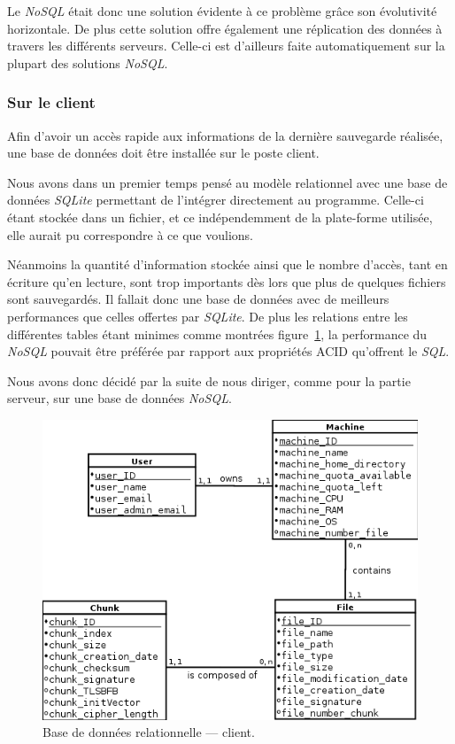 \documentclass[a4paper,10pt, twoside]{report}
\begin{document}
\begin{spacing}{1.2}
Le \textit{NoSQL} était donc une solution évidente à ce problème grâce son
évolutivité horizontale. De plus cette solution offre également une réplication
des données à travers les différents serveurs. Celle-ci est d'ailleurs faite
automatiquement sur la plupart des solutions \textit{NoSQL}.

\subsubsection{Sur le client}

Afin d'avoir un accès rapide aux informations de la dernière sauvegarde
réalisée, une base de données doit être installée sur le poste client.

Nous avons dans un premier temps pensé au modèle relationnel avec une base
de données \textit{SQLite} permettant de l'intégrer directement au programme.
Celle-ci étant stockée dans un fichier, et ce indépendemment de la plate-forme
utilisée, elle aurait pu correspondre à ce que voulions.

Néanmoins la quantité d'information stockée ainsi que le nombre d'accès, tant
en écriture qu'en lecture, sont trop importants dès lors que plus de quelques
fichiers sont sauvegardés. Il fallait donc une base de données avec de
meilleurs performances que celles offertes par \textit{SQLite}. De plus les
relations entre les différentes tables étant minimes comme montrées
figure~\ref{dbRelClient}, la performance du \textit{NoSQL} pouvait être
préférée par rapport aux propriétés ACID qu'offrent le \textit{SQL}.

Nous avons donc décidé par la suite de nous diriger, comme pour la partie
serveur, sur une base de données \textit{NoSQL}.

\begin{figure}[h!]
  \centering
  \includegraphics[scale=0.69]{softwareDesign/dbRelClient.png}
  \caption{\label{dbRelClient} Base de données relationnelle --- client.}
\end{figure}


\end{spacing}
\end{document}
